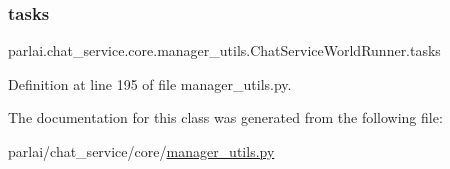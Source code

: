 \subsubsection{\texorpdfstring{tasks}{tasks}}
{\footnotesize\ttfamily parlai.\+chat\+\_\+service.\+core.\+manager\+\_\+utils.\+Chat\+Service\+World\+Runner.\+tasks}



Definition at line 195 of file manager\+\_\+utils.\+py.



The documentation for this class was generated from the following file\+:\begin{DoxyCompactItemize}
\item 
parlai/chat\+\_\+service/core/\hyperlink{manager__utils_8py}{manager\+\_\+utils.\+py}\end{DoxyCompactItemize}
